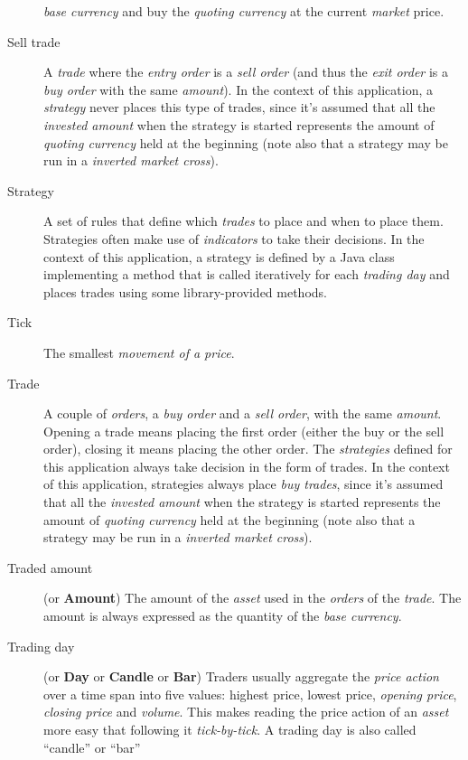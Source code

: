 \begin{description}
		\textit{base currency} and buy the \textit{quoting currency} at
		the current \textit{market} price.
	\item[Sell trade] A \textit{trade} where the \textit{entry order} is a
		\textit{sell order} (and thus the \textit{exit order} is a
		\textit{buy order} with the same \textit{amount}). In the
		context of this application, a \textit{strategy} never places
		this type of trades, since it's assumed that all the
		\textit{invested amount} when the strategy is started represents
		the amount of \textit{quoting currency} held at the beginning
		(note also that a strategy may be run in a \textit{inverted
		market cross}).
	\item[Strategy] A set of rules that define which \textit{trades} to
		place and when to place them. Strategies often make use of
		\textit{indicators} to take their decisions. In the context of
		this application, a strategy is defined by a Java class
		implementing a method that is called iteratively for each
		\textit{trading day} and places trades using some
		library-provided methods.
	\item[Tick] The smallest \textit{movement of a price}.
	\item[Trade] A couple of \textit{orders}, a \textit{buy order} and a
		\textit{sell order}, with the same \textit{amount}. Opening a
		trade means placing the first order (either the buy or the sell
		order), closing it means placing the other order. The
		\textit{strategies} defined for this application always take
		decision in the form of trades. In the context of this
		application, strategies always place \textit{buy trades}, since
		it's assumed that all the \textit{invested amount} when the
		strategy is started represents the amount of \textit{quoting
		currency} held at the beginning (note also that a strategy may
		be run in a \textit{inverted market cross}).
	\item[Traded amount] (or \textbf{Amount}) The amount of the
		\textit{asset} used in the \textit{orders} of the
		\textit{trade}. The amount is always expressed as the quantity
		of the \textit{base currency}.
	\item[Trading day] (or \textbf{Day} or \textbf{Candle} or \textbf{Bar})
		Traders usually aggregate the \textit{price action} over a time
		span into five values: highest price, lowest price,
		\textit{opening price}, \textit{closing price} and
		\textit{volume}. This makes reading the price action of an
		\textit{asset} more easy that following it \emph{tick-by-tick}.
		A trading day is also called \enquote{candle} or \enquote{bar}

\end{description}
